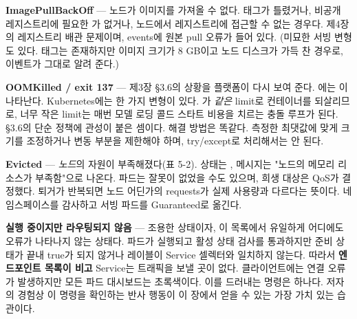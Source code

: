 \begin{tbbitemize}
  \item \textbf{ImagePullBackOff} — 노드가 이미지를 가져올 수 없다. 태그가 틀렸거나, 비공개 레지스트리에 필요한 가 없거나, 노드에서 레지스트리에 접근할 수 없는 경우다. 제4장의 레지스트리 배관 문제이며,  events에 원본 pull 오류가 들어 있다. (미묘한 서빙 변형도 있다. 태그는 존재하지만 이미지 크기가 8 GB이고 노드 디스크가 가득 찬 경우로, 이벤트가 그대로 알려 준다.)
  \item \textbf{OOMKilled / exit 137} — 제3장 §3.6의 상황을 플랫폼이 다시 보여 준다. 에는 이 나타난다. Kubernetes에는 한 가지 변형이 있다. 가 \textit{같은} limit로 컨테이너를 되살리므로, 너무 작은 limit는 매번 모델 로딩 콜드 스타트 비용을 치르는 충돌 루프가 된다. §3.6의 단순 정책에 관성이 붙은 셈이다. 해결 방법은 똑같다. 측정한 최댓값에 맞게 크기를 조정하거나 변동 부분을 제한해야 하며, try/except로 처리해서는 안 된다.
  \item \textbf{Evicted} — \textit{노드}의 자원이 부족해졌다(표 5-2). 상태는 , 메시지는 "노드의 메모리 리소스가 부족함"으로 나온다. 파드는 잘못이 없었을 수도 있으며, 희생 대상은 QoS가 결정했다. 퇴거가 반복되면 노드 어딘가의 requests가 실제 사용량과 다르다는 뜻이다. 네임스페이스를 감사하고 서빙 파드를 Guaranteed로 옮긴다.
  \item \textbf{실행 중이지만 라우팅되지 않음} — 조용한 상태이자, 이 목록에서 유일하게 어디에도 오류가 나타나지 않는 상태다. 파드가 실행되고 활성 상태 검사를 통과하지만 준비 상태가 끝내 true가 되지 않거나 레이블이 Service 셀렉터와 일치하지 않는다. 따라서 \textbf{엔드포인트 목록이 비고} Service는 트래픽을 보낼 곳이 없다. 클라이언트에는 연결 오류가 발생하지만 모든 파드 대시보드는 초록색이다. 이를 드러내는 명령은  하나다. 저자의 경험상 이 명령을 확인하는 반사 행동이 이 장에서 얻을 수 있는 가장 가치 있는 습관이다.
\end{tbbitemize}

